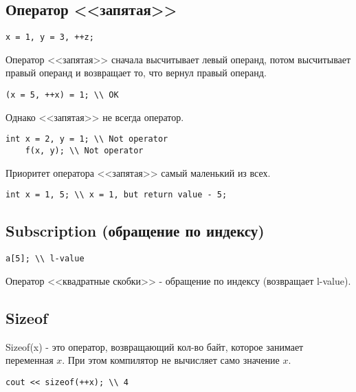 \subsection{Оператор <<запятая>>}

\begin{Verbatim}[tabsize=4]
	x = 1, y = 3, ++z;
\end{Verbatim}

Оператор <<запятая>> сначала высчитывает левый операнд, потом высчитывает правый операнд и возвращает то, что вернул правый операнд.

\begin{Verbatim}[tabsize=4]
	(x = 5, ++x) = 1; \\ OK
\end{Verbatim}

Однако <<запятая>> не всегда оператор.

\begin{Verbatim}[tabsize=4]
	int x = 2, y = 1; \\ Not operator
	f(x, y); \\ Not operator
\end{Verbatim}

Приоритет оператора <<запятая>> самый маленький из всех.

\begin{Verbatim}[tabsize=4]
	int x = 1, 5; \\ x = 1, but return value - 5;
\end{Verbatim}


\subsection{Subscription (обращение по индексу)}

\begin{Verbatim}[tabsize=4]
	a[5]; \\ l-value
\end{Verbatim}

Оператор <<квадратные скобки>> - обращение по индексу (возвращает l-value).


\subsection{Sizeof}

Sizeof(x) - это оператор, возвращающий кол-во байт, которое занимает переменная $x$. При этом компилятор не вычисляет само значение $x$.

\begin{Verbatim}[tabsize=4]
	cout << sizeof(++x); \\ 4
\end{Verbatim} 

